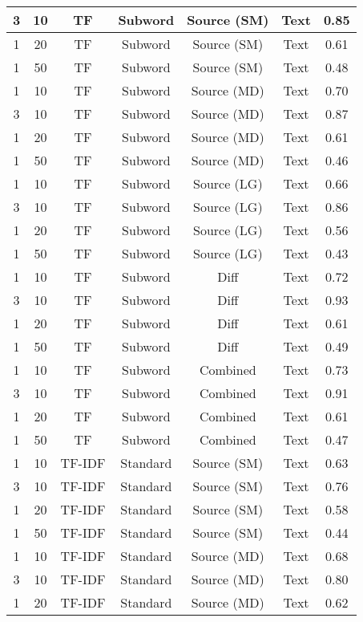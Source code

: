 \begin{longtable}{|c|c|c|c|c|c|c|}
\hline
3 & 10 & TF & Subword & Source (SM) & Text & 0.85 \\
\hline
1 & 20 & TF & Subword & Source (SM) & Text & 0.61 \\
\hline
1 & 50 & TF & Subword & Source (SM) & Text & 0.48 \\
\hline
1 & 10 & TF & Subword & Source (MD) & Text & 0.70 \\
\hline
3 & 10 & TF & Subword & Source (MD) & Text & 0.87 \\
\hline
1 & 20 & TF & Subword & Source (MD) & Text & 0.61 \\
\hline
1 & 50 & TF & Subword & Source (MD) & Text & 0.46 \\
\hline
1 & 10 & TF & Subword & Source (LG) & Text & 0.66 \\
\hline
3 & 10 & TF & Subword & Source (LG) & Text & 0.86 \\
\hline
1 & 20 & TF & Subword & Source (LG) & Text & 0.56 \\
\hline
1 & 50 & TF & Subword & Source (LG) & Text & 0.43 \\
\hline
1 & 10 & TF & Subword & Diff & Text & 0.72 \\
\hline
3 & 10 & TF & Subword & Diff & Text & 0.93 \\
\hline
1 & 20 & TF & Subword & Diff & Text & 0.61 \\
\hline
1 & 50 & TF & Subword & Diff & Text & 0.49 \\
\hline
1 & 10 & TF & Subword & Combined & Text & 0.73 \\
\hline
3 & 10 & TF & Subword & Combined & Text & 0.91 \\
\hline
1 & 20 & TF & Subword & Combined & Text & 0.61 \\
\hline
1 & 50 & TF & Subword & Combined & Text & 0.47 \\
\hline
1 & 10 & TF-IDF & Standard & Source (SM) & Text & 0.63 \\
\hline
3 & 10 & TF-IDF & Standard & Source (SM) & Text & 0.76 \\
\hline
1 & 20 & TF-IDF & Standard & Source (SM) & Text & 0.58 \\
\hline
1 & 50 & TF-IDF & Standard & Source (SM) & Text & 0.44 \\
\hline
1 & 10 & TF-IDF & Standard & Source (MD) & Text & 0.68 \\
\hline
3 & 10 & TF-IDF & Standard & Source (MD) & Text & 0.80 \\
\hline
1 & 20 & TF-IDF & Standard & Source (MD) & Text & 0.62 \\
\hline

\end{longtable}
